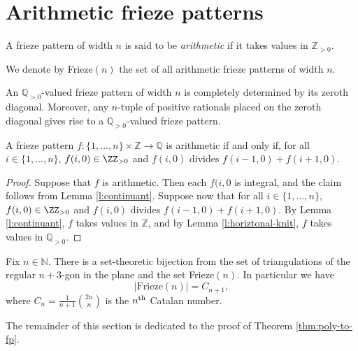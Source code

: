 \chapter{Arithmetic frieze patterns}
\begin{definition}
\label{def:arith-fp}
    A frieze pattern of width $n$ is said to be \textit{arithmetic} if it takes values in $\mathbb{Z}_{>0}$. 
\end{definition}

We denote by Frieze$(n)$ the set of all arithmetic frieze patterns of width $n$. 

\begin{lemma}
    \label{l:horiztonal-knit}
    An $\mathbb{Q}_{>0}$-valued frieze pattern of width $n$ is completely determined by its
    zeroth diagonal. Moreover, any $n$-tuple of positive rationals placed on the zeroth diagonal 
    gives rise to a $\mathbb{Q}_{>0}$-valued frieze pattern.
\end{lemma}

\begin{lemma}
    \label{l:lower-bound-crit}
    A frieze pattern $f : \{1,\ldots, n\} \times \mathbb{Z} \to \mathbb{Q}$ is arithmetic if and only if, 
    for all $i \in \{1, \ldots , n\}$, $f(i,0) \in \ZZ_{>0}$ and $f(i,0)$ divides $f(i-1,0) + f(i+1,0)$.
\end{lemma}
\begin{proof}
    Suppose that $f$ is arithmetic. Then each $f(i,0$ is integral, and the claim follows from Lemma \ref{l:continuant}. 
    Suppose now that for all $i \in \{1, \ldots , n\}$, $f(i,0) \in \ZZ_{>0}$ and $f(i,0)$ divides $f(i-1,0) + f(i+1,0)$. By 
    Lemma \ref{l:continuant}, $f$ takes values in $\mathbb{Z}$, and by Lemma \ref{l:horiztonal-knit}, $f$ takes values in $\mathbb{Q}_{>0}$. 
\end{proof}

\begin{theorem}
\label{thm:poly-to-fp}
    Fix $n \in \mathbb{N}$. There is a set-theoretic bijection from the set of triangulations of the regular $n+3$-gon in the plane
    and the set Frieze$(n)$. In particular we have
    \[
        |\text{Frieze}(n)| = C_{n+1},
    \]
    where $C_n = \frac{1}{n+1}\binom{2n}{n}$ is the $n^{\rm th}$ Catalan number.
\end{theorem}

The remainder of this section is dedicated to the proof of Theorem \ref{thm:poly-to-fp}. 

